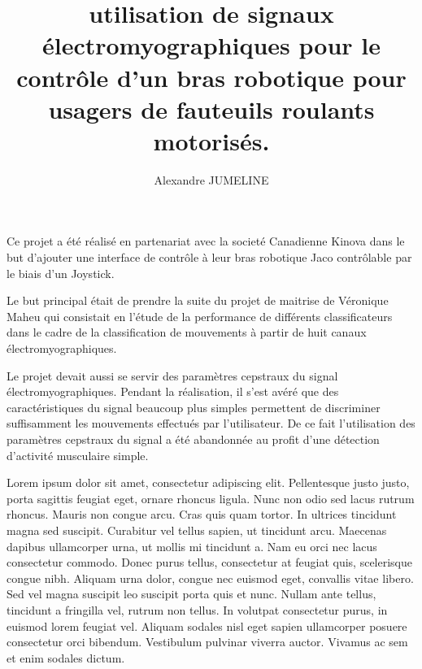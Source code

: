 \documentclass[letterpaper, twoside, 12pt, memoire, creativecommons, hyperref]{thETS}
\title{utilisation de signaux électromyographiques pour le contrôle d'un bras robotique pour usagers de fauteuils roulants motorisés.}
\author{Alexandre JUMELINE}
\begin{document}

\maketitle

\presentjury

\begin{avantpropos}
Ce projet a été réalisé en partenariat avec la societé Canadienne Kinova dans le but d'ajouter une interface de contrôle à leur bras robotique Jaco contrôlable par le biais d'un Joystick. 

Le but principal était de prendre la suite du projet de maitrise de Véronique Maheu qui consistait en l'étude de la performance de différents classificateurs dans le cadre de la classification de mouvements à partir de huit canaux électromyographiques. 

Le projet devait aussi se servir des paramètres cepstraux du signal électromyographiques. Pendant la réalisation, il s'est avéré que des caractéristiques du signal beaucoup plus simples permettent de discriminer suffisamment les mouvements effectués par l'utilisateur. De ce fait l'utilisation des paramètres cepstraux du signal a été abandonnée au profit d'une détection d'activité musculaire simple.
\end{avantpropos}

\begin{remerciements}
Lorem ipsum dolor sit amet, consectetur adipiscing elit. Pellentesque justo justo, porta sagittis feugiat eget, ornare rhoncus ligula. Nunc non odio sed lacus rutrum rhoncus. Mauris non congue arcu. Cras quis quam tortor. In ultrices tincidunt magna sed suscipit. Curabitur vel tellus sapien, ut tincidunt arcu. Maecenas dapibus ullamcorper urna, ut mollis mi tincidunt a. Nam eu orci nec lacus consectetur commodo. Donec purus tellus, consectetur at feugiat quis, scelerisque congue nibh. Aliquam urna dolor, congue nec euismod eget, convallis vitae libero. Sed vel magna suscipit leo suscipit porta quis et nunc. Nullam ante tellus, tincidunt a fringilla vel, rutrum non tellus. In volutpat consectetur purus, in euismod lorem feugiat vel. Aliquam sodales nisl eget sapien ullamcorper posuere consectetur orci bibendum. Vestibulum pulvinar viverra auctor. Vivamus ac sem et enim sodales dictum.
\end{remerciements}
\end{document}
